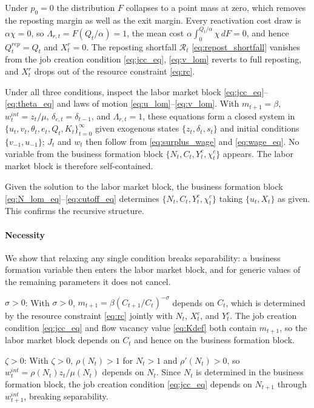 \documentclass[authoryear, review, 12pt]{elsarticle}
\begin{document}
Under $p_0=0$ the distribution $F$ collapses to a
point mass at zero, which removes the reposting
margin as well as the exit margin. Every
reactivation cost draw is $\alpha\chi=0$, so
$\Lambda_{r,t}=F(Q_t/\alpha)=1$, the mean cost
$\alpha\int_0^{Q_t/\alpha}\chi\,dF=0$, and hence
$Q_t^{rep}=Q_t$ and $X_t^r=0$. The reposting shortfall
$\mathcal{R}_t$ \eqref{eq:repost_shortfall} vanishes from the job
creation condition \eqref{eq:jcc_eq},
\eqref{eq:v_lom} reverts to full reposting, and
$X_t^r$ drops out of the resource constraint
\eqref{eq:rc}.

Under all three conditions, inspect the labor market
block \eqref{eq:jcc_eq}--\eqref{eq:theta_eq} and
laws of motion \eqref{eq:u_lom}--\eqref{eq:v_lom}.
With $m_{t+1}=\beta$, $w_t^{int}=z_t/\mu$,
$\delta_{e,t}=\delta_{t-1}$, and
$\Lambda_{r,t}=1$, these equations form
a closed system in
$\{u_t,v_t,\theta_t,e_t,Q_t,K_t\}_{t=0}^\infty$
given exogenous states $\{z_t,\delta_t,s_t\}$ and
initial conditions $\{v_{-1},u_{-1}\}$; $J_t$ and $w_t$
then follow from \eqref{eq:surplus_wage} and
\eqref{eq:wage_eq}. No variable
from the business formation block
$\{N_t,C_t,Y_t^c,\chi_t^c\}$ appears. The labor
market block is therefore self-contained.

Given the solution to the labor market block, 
the business formation block 
\eqref{eq:N_lom_eq}--\eqref{eq:cutoff_eq} 
determines $\{N_t,C_t,Y_t^c,\chi_t^c\}$ taking 
$\{u_t,X_t\}$ as given. This confirms the 
recursive structure.

\paragraph{Necessity}
We show that relaxing any single condition
breaks separability: a business formation variable then enters the labor market block, and
for generic values of the remaining parameters it does not cancel.

\emph{$\sigma>0$}: With $\sigma>0$, 
$m_{t+1}=\beta(C_{t+1}/C_t)^{-\sigma}$ depends on 
$C_t$, which is determined by the resource 
constraint \eqref{eq:rc} jointly with $N_t$, 
$X_t^c$, and $Y_t^c$. The job creation condition 
\eqref{eq:jcc_eq} and flow vacancy value 
\eqref{eq:Kdef} both contain $m_{t+1}$, so the 
labor market block depends on $C_t$ and hence on 
the business formation block.

\emph{$\zeta>0$}: With $\zeta>0$, $\rho(N_t)>1$ 
for $N_t>1$ and $\rho'(N_t)>0$, so 
$w_t^{int}=\rho(N_t)z_t/\mu(N_t)$ depends on $N_t$. 
Since $N_t$ is determined in the business formation 
block, the job creation condition \eqref{eq:jcc_eq} 
depends on $N_{t+1}$ through $w_{t+1}^{int}$, 
breaking separability.
\end{document}
